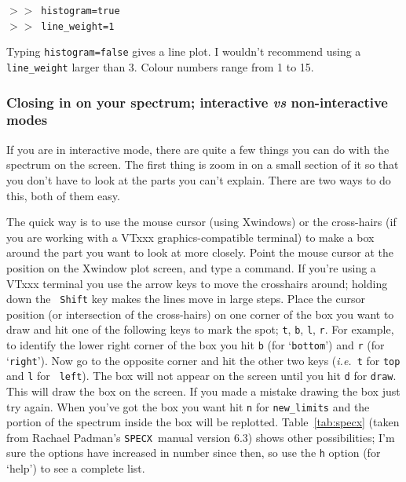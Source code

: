\documentclass[11pt,twoside]{article}
\newcommand{\ie}{{\it i.e.}}
\newcommand{\SPECX}{{\tt SPECX}}
\newcommand{\SP}{{$>\!>$}}
\begin{document}
\SP\ {\tt histogram=true}\\
\SP\ {\tt line\_weight=1}

Typing {\tt histogram=false} gives a line plot. I wouldn't recommend
using a {\tt line\_weight} larger than 3. Colour numbers range from 1 to 15.


\subsubsection{Closing in on your spectrum; interactive {\it vs}
non-interactive modes}
\label{sec:specx_5.1}
If you are in interactive mode, there are quite a few things
you can do with the spectrum on the screen. The first thing is zoom in
on a small section of it so that you don't have to look at the parts
you can't explain.  There are two ways to do this, both of them easy.

The quick way is to use the mouse cursor (using Xwindows) or the
cross-hairs (if you are working with a VTxxx graphics-compatible
terminal) to make a box around the part you want to look at more
closely. Point the mouse cursor at the position on the Xwindow plot
screen, and type a command. If you're using a VTxxx terminal you use
the arrow keys to move the crosshairs around; holding down the {\tt
Shift} key makes the lines move in large steps.  Place the cursor
position (or intersection of the cross-hairs) on one corner of the box
you want to draw and hit one of the following keys to mark the spot;
{\tt t}, {\tt b}, {\tt l}, {\tt r}.  For example, to identify the
lower right corner of the box you hit {\tt b} (for `{\tt{bottom}}') and
{\tt r} (for `{\tt{right}}'). Now go to the opposite corner and hit the
other two keys (\ie\ {\tt t} for {\tt top} and {\tt l} for {\tt
left}). The box will not appear on the screen until you hit {\tt d}
for {\tt draw}.  This will draw the box on the screen. If you made a
mistake drawing the box just try again.  When
you've got the box you want hit {\tt n} for {\tt new\_limits} and the
portion of the spectrum inside the box will be replotted.
Table~\ref{tab:specx} (taken from Rachael Padman's \SPECX\ manual
version 6.3) shows other possibilities; I'm sure the options have
increased in number since then, so use the {\tt h} option (for `help')
to see a complete list.
\end{document}
